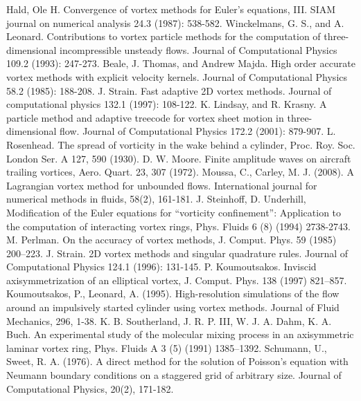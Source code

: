 \documentclass[letterpaper,12pt]{report}
\begin{document}
\begin{thebibliography}{8}
Hald, Ole H. Convergence of vortex methods for Euler's equations, III. SIAM journal on numerical analysis 24.3 (1987): 538-582.
Winckelmans, G. S., and A. Leonard. Contributions to vortex particle methods for the computation of three-dimensional incompressible unsteady flows. Journal of Computational Physics 109.2 (1993): 247-273.
Beale, J. Thomas, and Andrew Majda. High order accurate vortex methods with explicit velocity kernels. Journal of Computational Physics 58.2 (1985): 188-208.
J. Strain. Fast adaptive 2D vortex methods. Journal of computational physics 132.1 (1997): 108-122.
K. Lindsay, and R. Krasny. A particle method and adaptive treecode for vortex sheet motion in three-dimensional flow. Journal of Computational Physics 172.2 (2001): 879-907.
L. Rosenhead. The spread of vorticity in the wake behind a cylinder, Proc. Roy. Soc. London Ser. A 127, 590 (1930).
D. W. Moore. Finite amplitude waves on aircraft trailing vortices, Aero. Quart. 23, 307 (1972).
Moussa, C., Carley, M. J. (2008). A Lagrangian vortex method for unbounded flows. International journal for numerical methods in fluids, 58(2), 161-181.
J. Steinhoff, D. Underhill, Modification of the Euler equations for ``vorticity confinement'': Application to the computation of interacting vortex rings, Phys. Fluids 6 (8) (1994) 2738-2743.
M. Perlman. On the accuracy of vortex methods, J. Comput. Phys. 59 (1985) 200–223.
J. Strain. 2D vortex methods and singular quadrature rules. Journal of Computational Physics 124.1 (1996): 131-145.
P. Koumoutsakos. Inviscid axisymmetrization of an elliptical vortex, J. Comput. Phys. 138 (1997) 821–857.
Koumoutsakos, P., Leonard, A. (1995). High-resolution simulations of the flow around an impulsively started cylinder using vortex methods. Journal of Fluid Mechanics, 296, 1-38.
K. B. Southerland, J. R. P. III, W. J. A. Dahm, K. A. Buch. An experimental study of the molecular mixing process in an axisymmetric laminar vortex ring, Phys. Fluids A 3 (5) (1991) 1385–1392.
Schumann, U., Sweet, R. A. (1976). A direct method for the solution of Poisson's equation with Neumann boundary conditions on a staggered grid of arbitrary size. Journal of Computational Physics, 20(2), 171-182.

\end{thebibliography}
\end{document}
